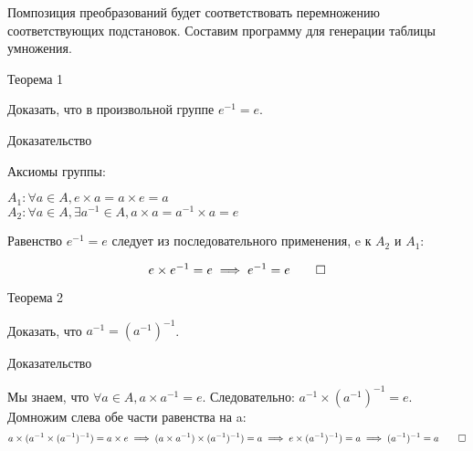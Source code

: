 \documentclass[12pt]{article}
\begin{document}
Помпозиция преобразований будет соответствовать перемножению соответствующих подстановок. Составим программу для генерации таблицы умножения.

\begin{center}
Теорема 1
\end{center}

Доказать, что в произвольной группе $e^{-1} = e$.

\begin{center}
Доказательство
\end{center}

Аксиомы группы:

\noindent
$A_1: \forall a \in A, e \times a = a \times e = a$\\
$A_2: \forall a \in A, \exists a^{-1} \in A, a \times a = a^{-1} \times a = e$

Равенство $e^{-1} = e$ следует из последовательного применения, e к $A_2$ и $A_1$:

$$
e \times e^{-1} = e \implies e^{-1} = e
\qed
$$
\begin{center}
Теорема 2
\end{center}
Доказать, что $a^{-1} = (a^{-1})^{-1}$.

\begin{center}
Доказательство
\end{center}

Мы знаем, что $\forall a \in A, a \times a^{-1} = e$. Следовательно: $a^{-1} \times (a^{-1})^{-1} = e$. Домножим слева обе части равенства на a:
$$
a \times (a^{-1} \times (a^{-1})^{-1}) = a \times e \implies
(a \times a^{-1}) \times (a^{-1})^{-1}) = a \implies
e \times (a^{-1})^{-1}) = a
\implies (a^{-1})^{-1} = a
\qed
$$
\end{document}
